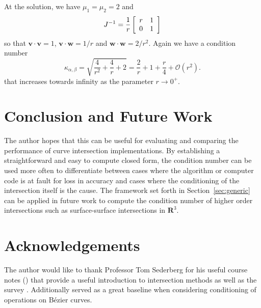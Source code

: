\documentclass[3p, authoryear, square]{elsarticle}
\theoremstyle{definition}
\newcommand{\reals}{\mathbf{R}}
\newcommand{\bigO}[1]{\mathcal{O}\left(#1\right)}
\begin{document}
At the solution, we have \(\mu_1 = \mu_2 = 2\) and
\begin{equation}
J^{-1} = \frac{1}{r}
\left[ \begin{array}{c c} r & 1 \\ 0 & 1 \end{array}\right]
\end{equation}
so that \(\bm{v} \cdot \bm{v} = 1\), \(\bm{v} \cdot \bm{w} =
1/r\) and \(\bm{w} \cdot \bm{w} = 2/r^2\). Again we have a condition number
\begin{equation}
\kappa_{\alpha, \beta} = \sqrt{\frac{4}{r^2} + \frac{4}{r} + 2} =
  \frac{2}{r} + 1 + \frac{r}{4} + \bigO{r^2}.
\end{equation}
that increases towards infinity as the parameter \(r \longrightarrow 0^+\).

\section{Conclusion and Future Work}

The author hopes that this can be useful for evaluating and comparing the
performance of curve intersection implementations. By establishing a
straightforward and easy to compute closed form, the condition number can be
used more often to differentiate between cases where the algorithm or computer
code is at fault for loss in accuracy and cases where the conditioning of the
intersection itself is the cause. The framework set forth in
Section~\ref{sec:generic} can be applied in future work to compute the
condition number of higher order intersections such as surface-surface
intersections in \(\reals^3\).

\section{Acknowledgements}

The author would like to thank Professor Tom Sederberg for his useful
course notes (\cite{SederbergNotes}) that provide a useful introduction to
intersection methods as well as the survey \cite{Sederberg1986}. Additionally
\cite{Farouki1987} served as a great baseline when considering conditioning
of operations on B\'{e}zier curves.

\section*{\refname}

\end{document}
